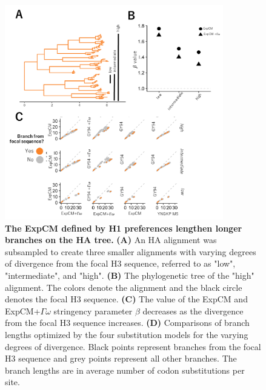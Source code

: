 \documentclass[11pt]{article}
\begin{document}
\begin{figure}[H]
\centerline{\includegraphics[width=0.85\textwidth]{figures/lee_competing}}
\caption{\label{fig:lee_compete}
\textbf{The ExpCM defined by H1 preferences lengthen longer branches on the HA tree.} 
\textbf{(A)} An HA alignment was subsampled to create three smaller alignments with varying degrees of divergence from the focal H3 sequence, referred to as "low", "intermediate", and "high". 
\textbf{(B)} The phylogenetic tree of the "high" alignment. 
The colors denote the alignment and the black circle denotes the focal H3 sequence. 
\textbf{(C)} The value of the ExpCM and ExpCM+$\Gamma\omega$ stringency parameter $\beta$ decreases as the divergence from the focal H3 sequence increases. 
\textbf{(D)} Comparisons of branch lengths optimized by the four substitution models for the varying degrees of divergence. 
Black points represent branches from the focal H3 sequence and grey points represent all other branches.  
The branch lengths are in average number of codon substitutions per site. 
}
\end{figure}


\clearpage 


\end{document}
